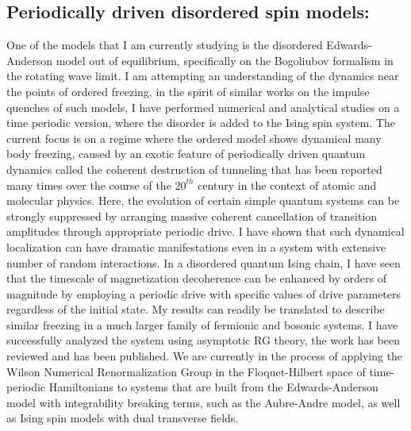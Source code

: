 \documentclass[a4paper,9pt]{article}
\begin{document}
\subsection{Periodically driven disordered spin models:}
\label{subsec:isingrand}
One of the models that I am currently studying is the disordered Edwards-Anderson model out of equilibrium, specifically on the Bogoliubov formalism in the rotating wave limit.  I am attempting an understanding of  the dynamics near the points of ordered freezing, in the spirit of similar works on the impulse quenches of such models, I have performed numerical and analytical studies on a time periodic version, where the disorder is added to the Ising spin system. The current focus is on a regime where the ordered model shows dynamical many body freezing, caused by an exotic feature of periodically driven  quantum dynamics called the coherent destruction of tunneling that has been reported many times over the course of the  $20^{th}$ century in the context of atomic and molecular physics. Here, the evolution of certain simple quantum systems can be strongly suppressed by arranging massive coherent cancellation of transition amplitudes through appropriate periodic drive. I have shown that such dynamical localization can have dramatic manifestations even in a system with extensive number of random interactions. In a disordered quantum Ising chain, I have seen that the timescale of
magnetization decoherence can be enhanced by orders of magnitude by employing a periodic drive with specific values of drive parameters regardless of the initial state. My results can readily be translated to describe similar freezing in a much larger family of fermionic and bosonic systems. I have successfully analyzed the system using asymptotic RG theory, the work has been reviewed and has been published. We are currently in the process of applying the Wilson Numerical Renormalization Group in the Floquet-Hilbert space of time-periodic Hamiltonians to systems that are built from the Edwards-Anderson model with integrability breaking terms, such as the Aubre-Andre model, as well as Ising spin models with dual transverse fields.
\end{document}
